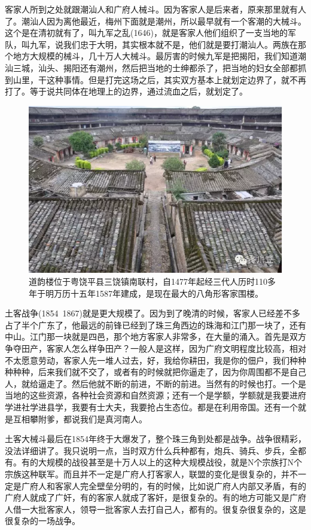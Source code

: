 客家人所到之处就跟潮汕人和广府人械斗。因为客家人是后来者，原来那里就有人了。潮汕人因为离他最近，梅州下面就是潮州，所以最早就有一个客潮的大械斗。这个是在清初就有了，叫九军之乱(1646)，就是客家人他们组织了一支当地的军队，叫九军，说我们忠于大明，其实根本就不是，他们就是要打潮汕人。两族在那个地方大规模的械斗，几十万人大械斗。最厉害的时候九军是把揭阳，我们知道潮汕三城，汕头、揭阳还有潮州，然后把当地的士绅都杀了，把当地的妇女全部都抓到山里，干这种事情。但是打完这场之后，其实双方基本上就划定边界了，就不再打了。等于说共同体在地理上的边界，通过流血之后，就划定了。


\begin{figure}
	\centering
	\includegraphics[width=\textwidth]{images/image-71}
	\caption{道韵楼位于粤饶平县三饶镇南联村，自1477年起经三代人历时110多年于明万历十五年1587年建成，是现在最大的八角形客家围楼。}
\end{figure}


土客战争(1854~1867)就是更大规模了。因为到了晚清的时候，客家人已经差不多占了半个广东了，他最远的前锋已经到了珠三角西边的珠海和江门那一块了，还有中山。江门那一块就是四邑，那个地方客家人非常多，在大量的涌入。首先是双方争夺田产，客家人怎么样争田产？一般人是这样，因为广府文明程度比较高，相对不太愿意劳动，客家人先一堆人过去，好，我给你耕田，我是你的佃户，我们种种种种种，后来我们就不交了，或者有的时候就把你逼走了，因为你周围都不是自己人，就给逼走了。然后他就不断的前进，不断的前进。当然有的时候也打。一个是当地的这些资源，各种社会资源和自然资源；还有一个是学额，学额就是我要进府学进社学进县学，我要有士大夫，我要抢占生态位。都是在利用帝国。还有一个就是互相攀附爹，都说我们是真河南人。

土客大械斗最后在1854年终于大爆发了，整个珠三角到处都是战争。战争很精彩，没法详细讲了。我只说明一点，当时双方什么兵种都有，炮兵、骑兵、步兵，全都有。有的大规模的战役甚至是十万人以上的这种大规模战役，就是N个宗族打N个宗族这种联军。而且并不一定是广府人打客家人，联盟的变化是很复杂的，并不一定是广府人和客家人完全壁垒分明的，有的时候，比如说广府人内部又矛盾，有的广府人就成了广奸，有的客家人就成了客奸，是很复杂的。有的地方可能又是广府人借一大批客家人，领导一批客家人去打自己人，都有的。很复杂很复杂的，这是很复杂的一场战争。

